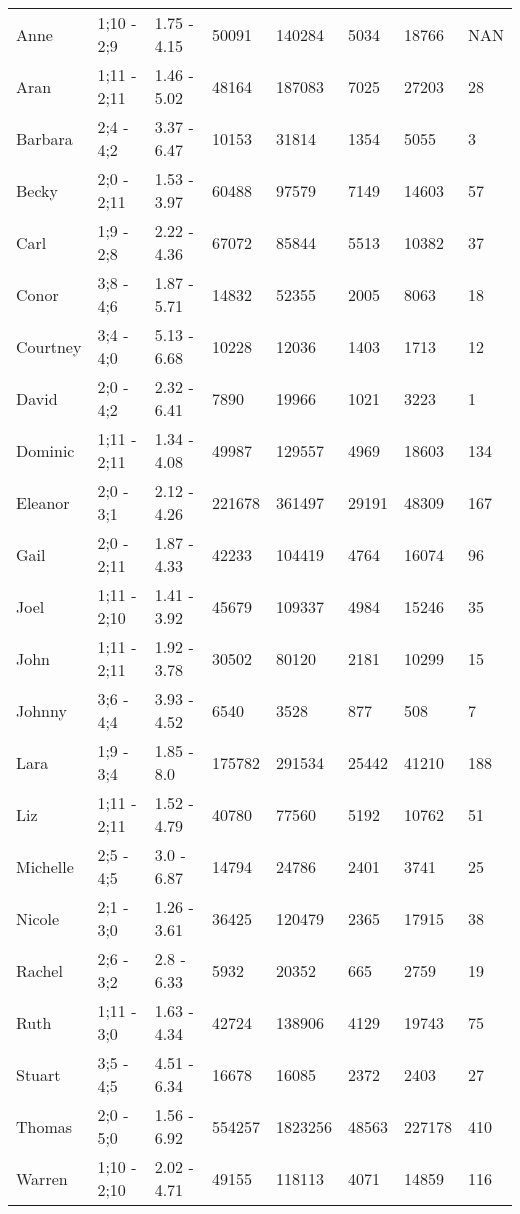 \begin{table}[]
\begin{tabular}{llllllll}
Anne & 1;10 - 2;9 & 1.75 - 4.15 & 50091 & 140284 & 5034 & 18766 & NAN \\
Aran & 1;11 - 2;11 & 1.46 - 5.02 & 48164 & 187083 & 7025 & 27203 & 28 \\
Barbara & 2;4 - 4;2 & 3.37 - 6.47 & 10153 & 31814 & 1354 & 5055 & 3 \\
Becky & 2;0 - 2;11 & 1.53 - 3.97 & 60488 & 97579 & 7149 & 14603 & 57 \\
Carl & 1;9 - 2;8 & 2.22 - 4.36 & 67072 & 85844 & 5513 & 10382 & 37 \\
Conor & 3;8 - 4;6 & 1.87 - 5.71 & 14832 & 52355 & 2005 & 8063 & 18 \\
Courtney & 3;4 - 4;0 & 5.13 - 6.68 & 10228 & 12036 & 1403 & 1713 & 12 \\
David & 2;0 - 4;2 & 2.32 - 6.41 & 7890 & 19966 & 1021 & 3223 & 1 \\
Dominic & 1;11 - 2;11 & 1.34 - 4.08 & 49987 & 129557 & 4969 & 18603 & 134 \\
Eleanor & 2;0 - 3;1 & 2.12 - 4.26 & 221678 & 361497 & 29191 & 48309 & 167 \\
Gail & 2;0 - 2;11 & 1.87 - 4.33 & 42233 & 104419 & 4764 & 16074 & 96 \\
Joel & 1;11 - 2;10 & 1.41 - 3.92 & 45679 & 109337 & 4984 & 15246 & 35 \\
John & 1;11 - 2;11 & 1.92 - 3.78 & 30502 & 80120 & 2181 & 10299 & 15 \\
Johnny & 3;6 - 4;4 & 3.93 - 4.52 & 6540 & 3528 & 877 & 508 & 7 \\
Lara & 1;9 - 3;4 & 1.85 - 8.0 & 175782 & 291534 & 25442 & 41210 & 188 \\
Liz & 1;11 - 2;11 & 1.52 - 4.79 & 40780 & 77560 & 5192 & 10762 & 51 \\
Michelle & 2;5 - 4;5 & 3.0 - 6.87 & 14794 & 24786 & 2401 & 3741 & 25 \\
Nicole & 2;1 - 3;0 & 1.26 - 3.61 & 36425 & 120479 & 2365 & 17915 & 38 \\
Rachel & 2;6 - 3;2 & 2.8 - 6.33 & 5932 & 20352 & 665 & 2759 & 19 \\
Ruth & 1;11 - 3;0 & 1.63 - 4.34 & 42724 & 138906 & 4129 & 19743 & 75 \\
Stuart & 3;5 - 4;5 & 4.51 - 6.34 & 16678 & 16085 & 2372 & 2403 & 27 \\
Thomas & 2;0 - 5;0 & 1.56 - 6.92 & 554257 & 1823256 & 48563 & 227178 & 410 \\
Warren & 1;10 - 2;10 & 2.02 - 4.71 & 49155 & 118113 & 4071 & 14859 & 116
\end{tabular}
\end{table}